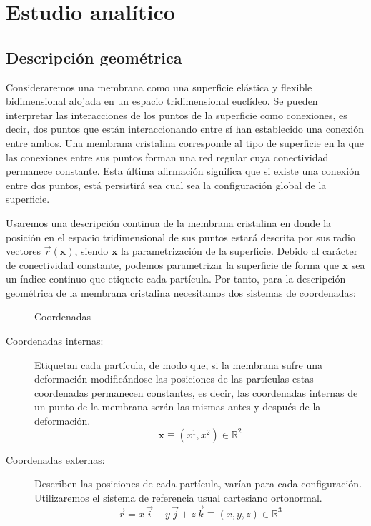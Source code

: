 \chapter{Estudio analítico}

\section{Descripción geométrica}

Consideraremos una membrana como una superficie elástica y flexible 
bidimensional alojada en un espacio tridimensional euclídeo. 
Se pueden interpretar las interacciones de los puntos de la superficie como
conexiones, es decir, dos puntos que están interaccionando entre sí han
establecido una conexión entre ambos. Una membrana cristalina corresponde al
tipo de superficie en la que las conexiones entre sus puntos forman una red
regular cuya conectividad permanece constante. Esta última afirmación
significa que si existe una conexión entre dos puntos, está persistirá sea
cual sea la configuración global de la superficie.

Usaremos una descripción continua de la membrana cristalina en donde la
posición en el espacio tridimensional de sus puntos estará descrita por sus
radio vectores $\vec{r}(\mathbf{x})$, siendo $\mathbf{x}$ la parametrización
de la superficie. Debido al carácter de conectividad constante, podemos
parametrizar la superficie de forma que $\mathbf{x}$ sea un índice continuo
que etiquete cada partícula. Por tanto, para la descripción geométrica de la
membrana cristalina necesitamos dos sistemas de coordenadas:

\begin{figure}[h]
\centering
{}
\quad
{}
\caption{Coordenadas }
\end{figure}

\begin{description}
\item[Coordenadas internas:] Etiquetan cada partícula, de modo que, si la
  membrana sufre una deformación modificándose las posiciones de las
  partículas estas coordenadas permanecen constantes, es decir, las
  coordenadas internas de un punto de la membrana serán las mismas antes y
  después de la deformación. 
  \begin{equation*}
  \mathbf{x}\equiv (x^1,x^2)\in \mathbb{R}^2
  \end{equation*}
\item[Coordenadas externas:] Describen las posiciones de cada partícula,
  varían para cada configuración. Utilizaremos el sistema de referencia usual
  cartesiano ortonormal.
  \begin{equation*}
    \vec{r}=x\,\vec{i}+y\,\vec{j}+z\,\vec{k}\equiv (x,y,z)\in \mathbb{R}^3
  \end{equation*}
\end{description}

